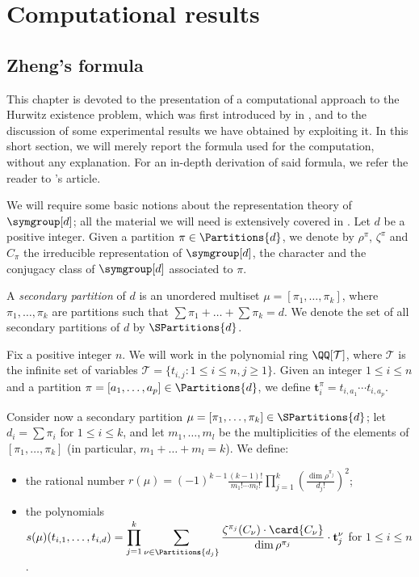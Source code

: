 \chapter{Computational results}\label{computational-results:ch}
\bgroup
\def\mytablewidth{0.8\textwidth}
\def\tt{\mathbf{t}}

\section{Zheng's formula}

This chapter is devoted to the presentation of a computational approach to the Hurwitz existence problem, which was first introduced by \citeauthor{zheng} in \cite{zheng}, and to the discussion of some experimental results we have obtained by exploiting it. In this short section, we will merely report the formula used for the computation, without any explanation. For an in-depth derivation of said formula, we refer the reader to \citeauthor{zheng}'s article.

We will require some basic notions about the representation theory of $\symgroup[d]$; all the material we will need is extensively covered in \cite{sagan}. Let $d$ be a positive integer. Given a partition $\pi\in\Partitions{d}$, we denote by $\rho^\pi$, $\zeta^\pi$ and $C_\pi$ the irreducible representation of $\symgroup[d]$, the character and the conjugacy class of $\symgroup[d]$ associated to $\pi$.

A \emph{secondary partition} of $d$ is an unordered multiset $\mu=[\pi_1,\ldots,\pi_k]$, where $\pi_1,\ldots,\pi_k$ are partitions such that $\sum\pi_1+\ldots+\sum\pi_k=d$. We denote the set of all secondary partitions of $d$ by $\SPartitions{d}$.

Fix a positive integer $n$. We will work in the polynomial ring $\QQ[\mathcal{T}]$, where $\mathcal{T}$ is the infinite set of variables $\mathcal{T}=\{t_{i,j}\colon 1\le i\le n,j\ge 1\}$. Given an integer $1\le i\le n$ and a partition $\pi=[a_1,\ldots,a_p]\in\Partitions{d}$, we define $\tt_i^\pi=t_{i,a_1}\cdots t_{i,a_p}$.

Consider now a secondary partition $\mu=[\pi_1,\ldots,\pi_k]\in\SPartitions{d}$; let $d_i=\sum\pi_i$ for $1\le i\le k$, and let $m_1,\ldots,m_l$ be the multiplicities of the elements of $[\pi_1,\ldots,\pi_k]$ (in particular, $m_1+\ldots+m_l=k$). We define:
\begin{itemize}
\item the rational number $\displaystyle r(\mu)=(-1)^{k-1}\frac{(k-1)!}{m_1!\cdots m_l!}\prod_{j=1}^k\left(\frac{\dim\rho^{\pi_j}}{d_j!}\right)^2$;
\item the polynomials $\displaystyle s(\mu)(t_{i,1},\ldots,t_{i,d})=\prod_{j=1}^k\sum_{\nu\in\Partitions{d_j}}\frac{\zeta^{\pi_j}(C_\nu)\cdot\card{C_\nu}}{\dim\rho^{\pi_j}}\cdot\tt_j^\nu$ for $1\le i\le n$.
\end{itemize}

